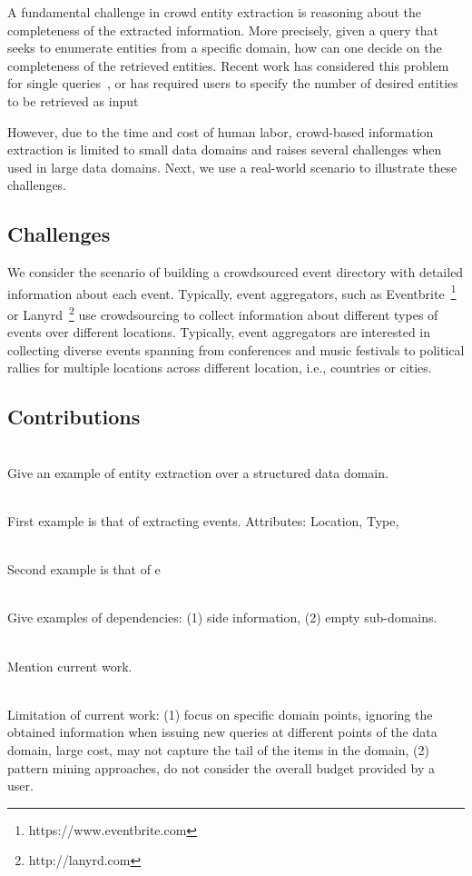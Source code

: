 \documentclass{sig-alternate}
\begin{document}
A fundamental challenge in crowd entity extraction is reasoning about the completeness of the extracted information. More precisely, given a query that seeks to enumerate entities from a specific domain, how can one decide on the completeness of the retrieved entities. Recent work has considered this problem for single queries~\cite{trushkowsky:2013}, or has required users to specify the number of desired entities to be retrieved as input~\cite{park:2014, amsterdamer:2014}

However, due to the time and cost of human labor, crowd-based information extraction is limited to small data domains and raises several challenges when used in large data domains. Next, we use a real-world scenario to illustrate these challenges.

\subsection{Challenges}
We consider the scenario of building a crowdsourced event directory with detailed information about each event. Typically, event aggregators, such as Eventbrite~\footnote{https://www.eventbrite.com} or Lanyrd~\footnote{http://lanyrd.com} use crowdsourcing to collect information about different types of events over different locations. Typically, event aggregators are interested in collecting diverse events spanning from conferences and music festivals to political rallies for multiple locations across different location, i.e., countries or cities. 

\subsection{Contributions}

\ \\Give an example of entity extraction over a structured data domain.

\ \\First example is that of extracting events. Attributes: Location, Type, 

\ \\Second example is that of e

\ \\Give examples of dependencies: (1) side information, (2) empty sub-domains.

\ \\Mention current work.

\ \\Limitation of current work: (1) focus on specific domain points, ignoring the obtained information when issuing new queries at different points of the data domain, large cost, may not capture the tail of the items in the domain, (2) pattern mining approaches, do not consider the overall budget provided by a user. 
\end{document}
